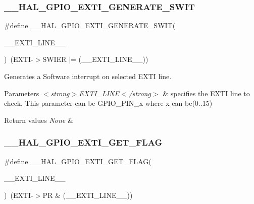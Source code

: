 \subsubsection{\texorpdfstring{\_\_HAL\_GPIO\_EXTI\_GENERATE\_SWIT}{\_\_HAL\_GPIO\_EXTI\_GENERATE\_SWIT}}
{\footnotesize\ttfamily \#define \+\_\+\+\_\+\+H\+A\+L\+\_\+\+G\+P\+I\+O\+\_\+\+E\+X\+T\+I\+\_\+\+G\+E\+N\+E\+R\+A\+T\+E\+\_\+\+S\+W\+IT(\begin{DoxyParamCaption}\item[{}]{\+\_\+\+\_\+\+E\+X\+T\+I\+\_\+\+L\+I\+N\+E\+\_\+\+\_\+ }\end{DoxyParamCaption})~(E\+X\+TI-\/$>$S\+W\+I\+ER $\vert$= (\+\_\+\+\_\+\+E\+X\+T\+I\+\_\+\+L\+I\+N\+E\+\_\+\+\_\+))}



Generates a Software interrupt on selected E\+X\+TI line. 


\begin{DoxyParams}{Parameters}
{\em $<$strong$>$\+E\+X\+T\+I\+\_\+\+L\+I\+N\+E$<$/strong$>$} & specifies the E\+X\+TI line to check. This parameter can be G\+P\+I\+O\+\_\+\+P\+I\+N\+\_\+x where x can be(0..15) \\
\hline
\end{DoxyParams}

\begin{DoxyRetVals}{Return values}
{\em None} & \\
\hline
\end{DoxyRetVals}
\mbox{\label{group___g_p_i_o___exported___macros_gaae18fc8d92ffa4df2172c78869e712fc}} 
\subsubsection{\texorpdfstring{\_\_HAL\_GPIO\_EXTI\_GET\_FLAG}{\_\_HAL\_GPIO\_EXTI\_GET\_FLAG}}
{\footnotesize\ttfamily \#define \+\_\+\+\_\+\+H\+A\+L\+\_\+\+G\+P\+I\+O\+\_\+\+E\+X\+T\+I\+\_\+\+G\+E\+T\+\_\+\+F\+L\+AG(\begin{DoxyParamCaption}\item[{}]{\+\_\+\+\_\+\+E\+X\+T\+I\+\_\+\+L\+I\+N\+E\+\_\+\+\_\+ }\end{DoxyParamCaption})~(E\+X\+TI-\/$>$PR \& (\+\_\+\+\_\+\+E\+X\+T\+I\+\_\+\+L\+I\+N\+E\+\_\+\+\_\+))}



